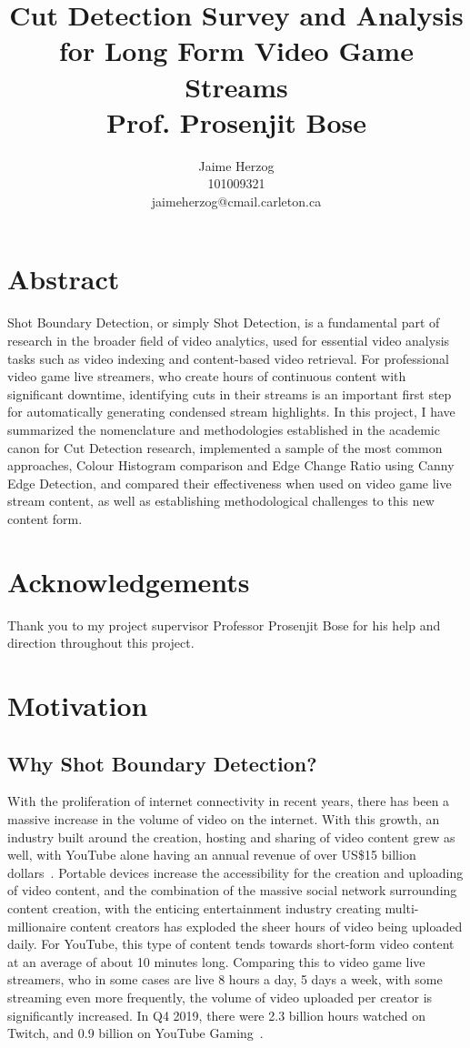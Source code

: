 \documentclass[12pt]{article}
\title{Cut Detection Survey and Analysis for Long Form Video Game Streams \\ Prof. Prosenjit Bose}
\author{Jaime Herzog\\ 101009321 \\ jaimeherzog@cmail.carleton.ca}
\begin{document}
\maketitle
\clearpage

\section{Abstract}
Shot Boundary Detection, or simply Shot Detection, is a fundamental part of research in the broader field of video analytics, used for essential video analysis tasks such as 
video indexing and content-based video retrieval. For professional video game live streamers, who create hours of continuous content with significant downtime, identifying
cuts in their streams is an important first step for automatically generating condensed stream highlights. In this project, I have summarized the nomenclature and methodologies
established in the academic canon for Cut Detection research, implemented a sample of the most common approaches, Colour Histogram comparison and Edge Change Ratio using Canny 
Edge Detection, and compared their effectiveness when used on video game live stream content, as well as establishing methodological challenges to this new content form.
\section{Acknowledgements}
Thank you to my project supervisor Professor Prosenjit Bose for his help and direction throughout this project.
\clearpage

\tableofcontents
\clearpage

\listoffigures
\listoftables
\clearpage

\section{Motivation}
\subsection{Why Shot Boundary Detection?}
    With the proliferation of internet connectivity in recent years, there has been a massive increase in the volume of video on the internet.
With this growth, an industry built around the creation, hosting and sharing of video content grew as well, with YouTube alone having an annual revenue of over US\$15 billion
dollars~\cite{youtube}. Portable devices increase the accessibility for the creation and uploading of video content, and the combination of the 
massive social network surrounding content creation, with the enticing entertainment industry creating multi-millionaire content creators has 
exploded the sheer hours of video being uploaded daily. For YouTube, this type of content tends towards short-form video content at an average of about 10 minutes long. Comparing
this to video game live streamers, who in some cases are live 8 hours a day, 5 days a week, with some streaming even more frequently, the volume of video uploaded
per creator is significantly increased. In Q4 2019, there were 2.3 billion hours watched on Twitch, and 0.9 billion on YouTube Gaming~\cite{twitchusage}. 
\end{document}
